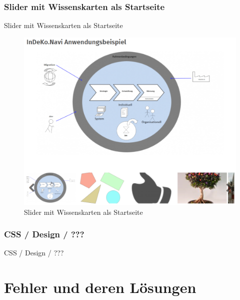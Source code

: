 \subsubsection{Slider mit Wissenskarten als Startseite}\label{subsub:wkslider}
Slider mit Wissenskarten als Startseite
\begin{figure}[H]
	\centering
	\includegraphics[height=0.20\textheight]{images/example_slider}
	\caption{Slider mit Wissenskarten als Startseite}
	\label{fig:example_slider}
\end{figure}

\subsubsection{CSS / Design / ???}\label{subsub:cssdesign}
CSS / Design / ???




\newpage
\section{Fehler und deren Lösungen}\label{sec:problems}

